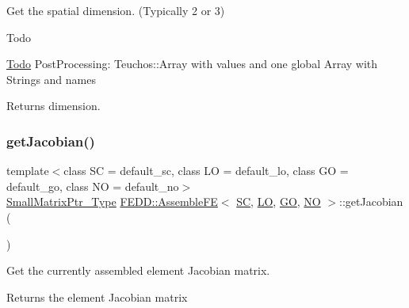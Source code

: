 Get the spatial dimension. (Typically 2 or 3) 

\begin{DoxyRefDesc}{Todo}
\item[\hyperlink{todo__todo000003}{Todo}]Post\+Processing\+: Teuchos\+::\+Array with values and one global Array with Strings and names \end{DoxyRefDesc}


\begin{DoxyReturn}{Returns}
dimension. 
\end{DoxyReturn}
\mbox{\label{classFEDD_1_1AssembleFE_af7fb8c5ae1f77eca6e8c7e887ea761ec}} 
\subsubsection{\texorpdfstring{get\+Jacobian()}{getJacobian()}}
{\footnotesize\ttfamily template$<$class SC  = default\+\_\+sc, class LO  = default\+\_\+lo, class GO  = default\+\_\+go, class NO  = default\+\_\+no$>$ \\
\hyperlink{classFEDD_1_1AssembleFE_afb5fb5dca3aab59f697a25884e99e894}{Small\+Matrix\+Ptr\+\_\+\+Type} \hyperlink{classFEDD_1_1AssembleFE}{F\+E\+D\+D\+::\+Assemble\+FE}$<$ \hyperlink{fe__test__laplace_8cpp_a79c7e86a57edbb2a5a53242bcd04e41e}{SC}, \hyperlink{fe__test__laplace_8cpp_ad6a38c9f07d3fd633eefca5bccad8410}{LO}, \hyperlink{fe__test__laplace_8cpp_afa2946b509009b4f45eb04bd8c5b27d9}{GO}, \hyperlink{fe__test__laplace_8cpp_a5e24f37b28787429872b6ecb1d0417ce}{NO} $>$\+::get\+Jacobian (\begin{DoxyParamCaption}{ }\end{DoxyParamCaption})\hspace{0.3cm}{\ttfamily [inline]}}



Get the currently assembled element Jacobian matrix. 

\begin{DoxyReturn}{Returns}
the element Jacobian matrix 
\end{DoxyReturn}
\mbox{\label{classFEDD_1_1AssembleFE_af11bbb371048522d35ecb1f4f2584a8a}} 

